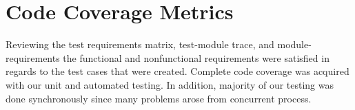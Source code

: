 \documentclass[12pt, titlepage]{article}
\begin{document}
\section{Code Coverage Metrics}
\indent \indent Reviewing the test requirements matrix, test-module trace, and module-requirements the functional and nonfunctional requirements were satisfied in regards to the test cases that were created. Complete code coverage was acquired with our unit and automated testing. In addition, majority of our testing was done synchronously since many problems arose from concurrent process.  



\end{document}

